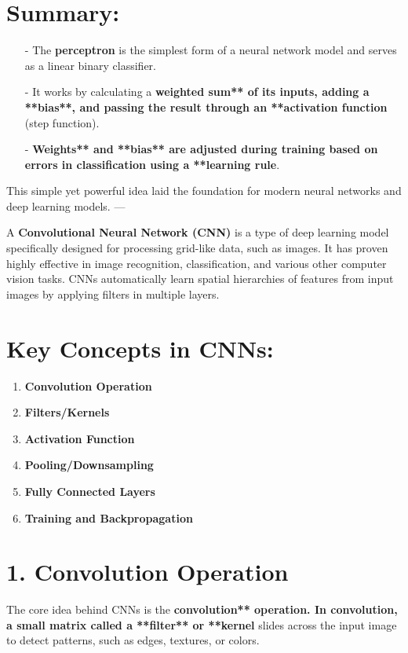 \documentclass[10pt]{article}
\begin{document}
\section{ Summary:}
\begin{itemize}
   \item [-] The {\bf perceptron} is the simplest form of a neural network model and serves as a linear binary classifier.
   \item [-] It works by calculating a {\bf weighted sum** of its inputs, adding a **bias**, and passing the result through an **activation function} (step function).
   \item [-] {\bf Weights** and **bias** are adjusted during training based on errors in classification using a **learning rule}.
\end{itemize}

This simple yet powerful idea laid the foundation for modern neural networks and deep learning models.
---

A {\bf Convolutional Neural Network (CNN)} is a type of deep learning model specifically designed for processing grid-like data, such as images. It has proven highly effective in image recognition, classification, and various other computer vision tasks. CNNs automatically learn spatial hierarchies of features from input images by applying filters in multiple layers.

\section{ Key Concepts in CNNs:}

\begin{enumerate}
   \item {\bf Convolution Operation}
   \item {\bf Filters/Kernels}
   \item {\bf Activation Function}
   \item {\bf Pooling/Downsampling}
   \item {\bf Fully Connected Layers}
   \item {\bf Training and Backpropagation}
\end{enumerate}

\section{ 1. {\bf Convolution Operation}}
The core idea behind CNNs is the {\bf convolution** operation. In convolution, a small matrix called a **filter** or **kernel} slides across the input image to detect patterns, such as edges, textures, or colors.
\end{document}
